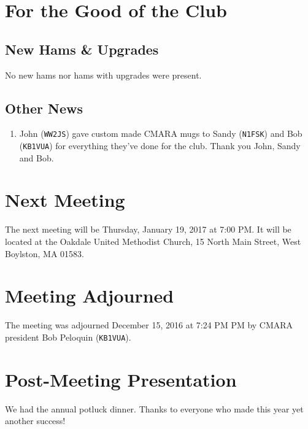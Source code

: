 \documentclass[10pt,letterpaper]{article}
\begin{document}
\section{For the Good of the Club}


\subsection{New Hams \& Upgrades}
No new hams nor hams with upgrades were present.

\subsection{Other News}
\begin{enumerate}
  \item John (\texttt{{WW2JS}}) gave custom made CMARA mugs to Sandy (\texttt{N1FSK}) and Bob (\texttt{KB1VUA}) for everything they've done for the club. Thank you John, Sandy and Bob.
\end{enumerate}

\section{Next Meeting}
The next meeting will be Thursday, January 19, 2017 at 7:00 PM. It will be located at the Oakdale United Methodist Church, 15 North Main Street, West Boylston, MA 01583.

\section{Meeting Adjourned}
The meeting was adjourned December 15, 2016 at 7:24 PM PM by CMARA president Bob Peloquin (\texttt{KB1VUA}).

\section{Post-Meeting Presentation}

We had the annual potluck dinner. Thanks to everyone who made this year yet another success!
\end{document}
